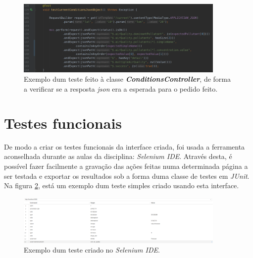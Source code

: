 \begin{figure}[t]
   \centering
   \includegraphics[width=0.90\textwidth]{images/controller_test}
   \caption{Exemplo dum teste feito à classe \textbf{\textit{ConditionsController}}, de forma a verificar se a resposta \textit{json} era a esperada para o pedido feito.}
   \label{fig:controller_test}
\end{figure}


\section{Testes funcionais}
De modo a criar os testes funcionais da interface criada, foi usada a ferramenta aconselhada durante as aulas da disciplina: \textit{Selenium IDE}. Através desta, é possível fazer facilmente a gravação das ações feitas numa determinada página a ser testada e exportar os resultados sob a forma duma classe de testes em \textit{JUnit}. Na figura \ref{fig:selenium_ide}, está um exemplo dum teste simples criado usando esta interface.

\begin{figure}[h]
   \centering
   \includegraphics[width=0.90\textwidth]{images/selenium_ide}
   \caption{Exemplo dum teste criado no \textit{Selenium IDE}.}
   \label{fig:selenium_ide}
\end{figure}

